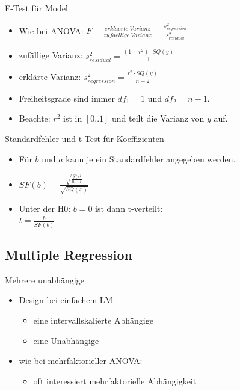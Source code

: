 \begin{frame}
  {F-Test für Model}
  \begin{itemize}[<+->]
    \item Wie bei ANOVA: \alert{$F=\frac{erklaerte\ Varianz}{zufaellige\ Varianz}=\frac{s^2_{regression}}{s^2_{residual}}$}
      \vspace{0.5cm}
    \item zufällige Varianz: \alert{$s^2_{residual}=\frac{(1-r^2)\cdot SQ(y)}{1}$}
    \item erklärte Varianz: \alert{$s^2_{regression}=\frac{r^2\cdot SQ(y)}{n-2}$}
      \vspace{0.5cm}
    \item Freiheitsgrade sind immer $df_1=1$ und $df_2=n-1$.
    \item Beachte: $r^2$ ist in $[0..1]$ und teilt die Varianz von $y$ auf.
  \end{itemize}
\end{frame}

\begin{frame}
  {Standardfehler und t-Test für Koeffizienten}
  \begin{itemize}[<+->]
    \item Für $b$ und $a$ kann je ein Standardfehler angegeben werden. 
      \vspace{0.5cm}
    \item \alert{$SF(b)=\frac{\sqrt{\frac{\sum e^2}{n-1}}}{\sqrt{SQ(x)}}$}
      \vspace{0.5cm}
    \item Unter der H0: $b=0$ ist dann t-verteilt:\\
      \alert{$t=\frac{b}{SF(b)}$}
  \end{itemize}
\end{frame}

\subsection{Multiple Regression}

\begin{frame}
  {Mehrere unabhängige}
  \begin{itemize}[<+->]
    \item Design bei einfachem LM:
      \begin{itemize}[<+->]
	\item \alert{eine intervallskalierte Abhängige}
	\item \alert{eine Unabhängige}
      \end{itemize}
      \vspace{0.5cm}
    \item wie bei mehrfaktorieller ANOVA:
      \begin{itemize}[<+->]
	\item oft interessiert \alert{mehrfaktorielle Abhängigkeit}
      \end{itemize}
  \end{itemize}
\end{frame}

